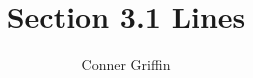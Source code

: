 \documentclass{ximera}
\title{Section 3.1 Lines}
\author{Conner Griffin}
\begin{document}
\begin{abstract}
    
\end{abstract}
\maketitle







\end{document}
